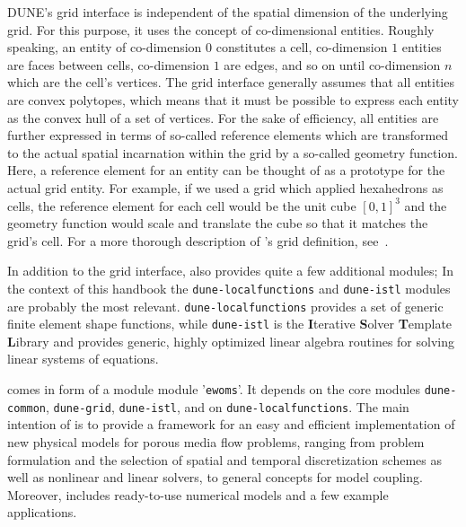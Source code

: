 DUNE's grid interface is independent of the spatial dimension of the
underlying grid. For this purpose, it uses the concept of
co-dimensional entities. Roughly speaking, an entity of co-dimension
$0$ constitutes a cell, co-dimension $1$ entities are faces between
cells, co-dimension $1$ are edges, and so on until co-dimension $n$
which are the cell's vertices.  The \Dune grid interface generally
assumes that all entities are convex polytopes, which means that it
must be possible to express each entity as the convex hull of a set of
vertices. For the sake of efficiency, all entities are further expressed in terms
of so-called reference elements which are transformed to the actual
spatial incarnation within the grid by a so-called geometry
function. Here, a reference element for an
entity can be thought of as a prototype for the actual grid
entity. For example, if we used a grid which applied hexahedrons as cells,
the reference element for each cell would be the unit cube $[0, 1]^3$
and the geometry function would scale and translate the cube so that
it matches the grid's cell. For a more thorough description of \Dune's
grid definition, see~\cite{BASTIAN2008}.

In addition to the grid interface, \Dune also provides quite a few
additional modules; In the context of this handbook the
\texttt{dune-localfunctions} and \texttt{dune-istl} modules are
probably the most relevant. \texttt{dune-localfunctions} provides a
set of generic finite element shape functions, while
\texttt{dune-istl} is the \textbf{I}terative \textbf{S}olver
\textbf{T}emplate \textbf{L}ibrary and provides generic, highly
optimized linear algebra routines for solving linear systems of
equations.

\eWoms comes in form of a module \Dune module '\texttt{ewoms}'.  It
depends on the \Dune core modules \texttt{dune-common},
\texttt{dune-grid}, \texttt{dune-istl}, and on
\texttt{dune-localfunctions}.  The main intention of \eWoms is to
provide a framework for an easy and efficient implementation of new
physical models for porous media flow problems, ranging from problem
formulation and the selection of spatial and temporal discretization
schemes as well as nonlinear and linear solvers, to general concepts
for model coupling.  Moreover, \eWoms includes ready-to-use numerical
models and a few example applications.

